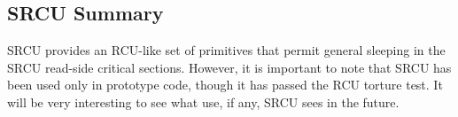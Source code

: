 \subsection{SRCU Summary}
\label{sec:app:rcuimpl:SRCU Summary}

SRCU provides an RCU-like set of primitives that permit general
sleeping in the SRCU read-side critical sections.
However, it is important to note that SRCU has been used only in
prototype code, though it has passed the RCU torture test.
It will be very interesting to see what use, if any, SRCU sees
in the future.
